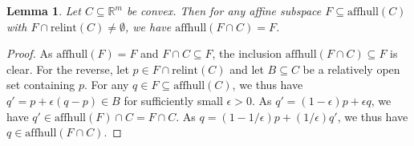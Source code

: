 \documentclass{article}
\newcommand{\reals}{\mathbb{R}}
\newcommand{\simplex}{\Delta_\Y}
\newcommand{\relint}[1]{\mathrm{relint}(#1)}
\newcommand{\affhull}{\mathrm{affhull}}
\newcommand{\R}{\mathcal{R}}
\newcommand{\Y}{\mathcal{Y}}
\newtheorem{lemma}{Lemma}
\newtheorem{definition}{Definition}
\begin{document}
\begin{lemma}\label{lem:affhull-relint}
  Let $C\subseteq\reals^m$ be convex.
  Then for any affine subspace $F\subseteq\affhull(C)$ with $F\cap\relint C \neq \emptyset$, we have $\affhull(F\cap C) = F$.
\end{lemma}
\begin{proof}
  As $\affhull(F) = F$ and $F\cap C\subseteq F$, the inclusion $\affhull(F\cap C) \subseteq F$ is clear.
  For the reverse, let $p\in F\cap\relint C$ and let $B\subseteq C$ be a relatively open set containing $p$.
  For any $q\in F \subseteq \affhull(C)$, we thus have $q' = p + \epsilon (q-p) \in B$ for sufficiently small $\epsilon > 0$.
  As $q' = (1-\epsilon) p + \epsilon q$, we have $q' \in \affhull(F)\cap C = F\cap C$.
  As $q = (1-1/\epsilon) p + (1/\epsilon) q'$, we thus have $q\in\affhull(F\cap C)$.
\end{proof}


\end{document}
